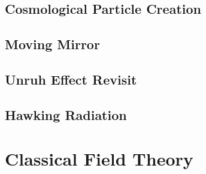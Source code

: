 \documentclass[12pt]{article}
\numberwithin{equation}{subsection}
\theoremstyle{mystyle}{\newtheorem{definition}{Definition}[subsection]}
\theoremstyle{mystyle}{\newtheorem{theorem}[definition]{Theorem}}
\theoremstyle{mystyle}{\newtheorem*{remark}{Remark}}
\theoremstyle{mystyle}{\newtheorem{example}{Example}[subsection]}
\theoremstyle{mystyle}{\newtheorem{examples}{Examples}[subsection]}
\theoremstyle{mystyle}{\newtheorem{cthm}{}[subsection]}
\begin{document}
\subsection{Cosmological Particle Creation}



\subsection{Moving Mirror}


\subsection{Unruh Effect Revisit}
\subsection{Hawking Radiation}


\newpage
\appendix
{}





\section{Classical Field Theory}


\newpage
\newpage
\end{document}
